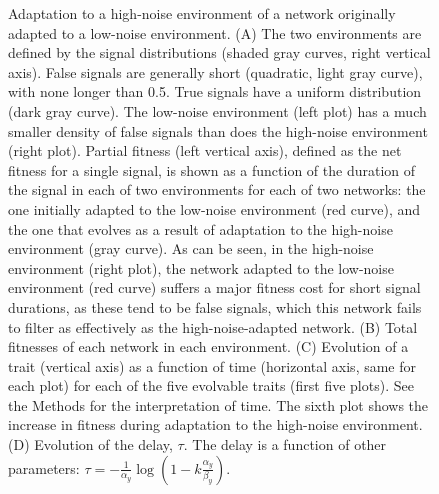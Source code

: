 \documentclass[dvips,12pt,twoside,titlepage]{article}
\begin{document}
\begin{figure}[p]
\begin{center}
\caption{Adaptation to a high-noise environment of a network originally adapted to a low-noise environment. (A) The two environments are defined by the signal distributions (shaded gray curves, right vertical axis). False signals are generally short (quadratic, light gray curve), with none longer than 0.5. True signals have a uniform distribution (dark gray curve).
The low-noise environment (left plot) has a much smaller density of false signals than does the high-noise environment (right plot). 
Partial fitness (left vertical axis), defined as the net fitness for a single signal, is shown as a function of the duration of the signal in each of two environments for each of two networks: the one initially adapted to the low-noise environment (red curve), and the one that evolves as a result of adaptation to the high-noise environment (gray curve). As can be seen, in the high-noise environment (right plot), the network adapted to the low-noise environment (red curve) suffers a major fitness cost for short signal durations, as these tend to be false signals, which this network fails to filter as effectively as the high-noise-adapted network. (B) Total fitnesses of each network in each environment. (C) Evolution of a trait (vertical axis) as a function of time (horizontal axis, same for each plot) for each of the five evolvable traits (first five plots). See the Methods for the interpretation of time. The sixth plot shows the increase in fitness during adaptation to the high-noise environment. (D) Evolution of the delay, $\tau$. The delay is a function of other parameters: $\tau = -\frac{1}{\alpha_y} \log(1-k\frac{\alpha_y}{\beta_y})$.}
\label{TwoEnv}
\end{center}
\end{figure}
\clearpage
\end{document}
